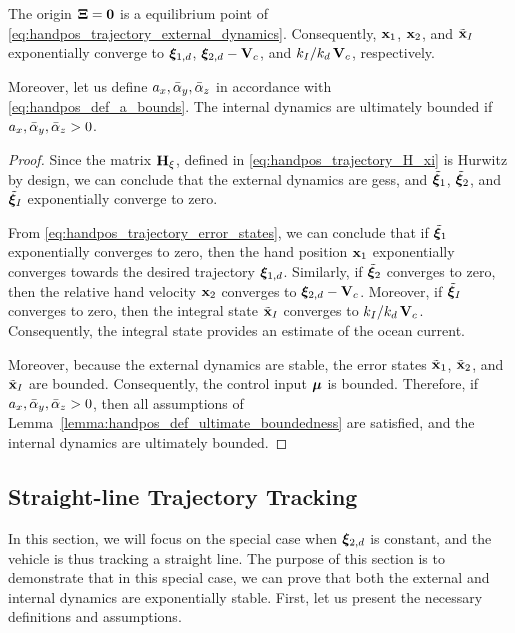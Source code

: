 \begin{prop}
    \label{prop:handpos_trajectory_trajectory_tracking}
    The origin $\bm{\Xi} = \mathbf{0}$ is a  equilibrium point of \eqref{eq:handpos_trajectory_external_dynamics}.
    Consequently, $\mathbf{x}_1$, $\mathbf{x}_2$, and $\tilde{\mathbf{x}}_I$ exponentially converge to $\bm{\xi}_{1, d}$, $\bm{\xi}_{2, d} - \mathbf{V}_c$, and $k_I/k_d\,\mathbf{V}_c$, respectively.

    Moreover, let us define $a_x, \Bar{\alpha}_y, \Bar{\alpha}_z$ in accordance with \eqref{eq:handpos_def_a_bounds}.
    The internal dynamics are ultimately bounded if $a_x, \Bar{\alpha}_y, \Bar{\alpha}_z > 0$.
\end{prop}
\begin{proof}
    Since the matrix $\mathbf{H}_{\xi}$, defined in \eqref{eq:handpos_trajectory_H_xi} is Hurwitz by design, we can conclude that the external dynamics are \glspl{ges}, and $\tilde{\bm{\xi}}_1$, $\tilde{\bm{\xi}}_2$, and $\tilde{\bm{\xi}}_I$ exponentially converge to zero.

    From \eqref{eq:handpos_trajectory_error_states}, we can conclude that if $\tilde{\bm{\xi}}_1$ exponentially converges to zero, then the hand position $\mathbf{x}_1$ exponentially converges towards the desired trajectory $\bm{\xi}_{1, d}$.
    Similarly, if $\tilde{\bm{\xi}}_2$ converges to zero, then the relative hand velocity $\mathbf{x}_2$ converges to $\bm{\xi}_{2, d} - \mathbf{V}_c$.
    Moreover, if $\tilde{\bm{\xi}}_I$ converges to zero, then the integral state $\tilde{\mathbf{x}}_I$ converges to $k_I/k_d\,\mathbf{V}_c$.
    Consequently, the integral state provides an estimate of the ocean current.

    Moreover, because the external dynamics are stable, the error states $\tilde{\mathbf{x}}_1$, $\tilde{\mathbf{x}}_2$, and $\tilde{\mathbf{x}}_I$ are bounded.
    Consequently, the control input $\bm{\mu}$ is bounded.
    Therefore, if $a_x, \Bar{\alpha}_y, \Bar{\alpha}_z > 0$, then all assumptions of Lemma~\ref{lemma:handpos_def_ultimate_boundedness} are satisfied, and the internal dynamics are ultimately bounded.
\end{proof}

\subsection{Straight-line Trajectory Tracking}
\label{sec:handpos_trajectory_straight_line_trajectory}
In this section, we will focus on the special case when $\bm{\xi}_{2, d}$ is constant, and the vehicle is thus tracking a straight line.
The purpose of this section is to demonstrate that in this special case, we can prove that both the external and internal dynamics are exponentially stable.
First, let us present the necessary definitions and assumptions.

